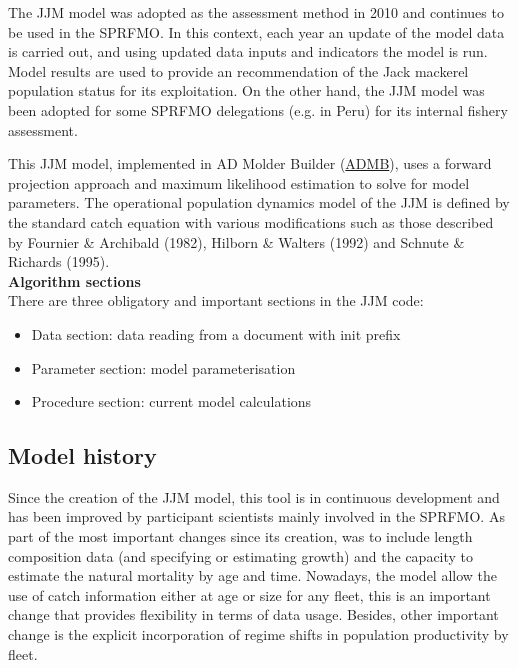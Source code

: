 \documentclass{article}
\begin{document}
The JJM model was adopted as the assessment method in 2010 and continues to be used in the SPRFMO. In this context, each year an update of the model data is carried out, and using updated data inputs and indicators the model is run. Model results are used to provide an recommendation of the Jack mackerel population status for its exploitation. On the other hand, the JJM model was been adopted for some SPRFMO delegations (e.g. in Peru) for its internal fishery assessment.

This JJM model, implemented in AD Molder Builder (\href{https://www.admb-project.org/}{ADMB}), uses a forward projection approach and maximum likelihood estimation to solve for model parameters. The operational population dynamics model of the JJM is defined by the standard catch equation with various modifications such as those described by Fournier \& Archibald (1982), Hilborn \& Walters (1992) and Schnute \& Richards (1995).\\

\textbf{Algorithm sections}\\

There are three obligatory and important sections in the JJM code:

\begin{itemize}
    \item Data section: data reading from a document with init prefix
    \item Parameter section: model parameterisation
    \item Procedure section: current model calculations
\end{itemize}

\subsection{Model history}
Since the creation of the JJM model, this tool is in continuous development and has been improved by participant scientists mainly involved in the SPRFMO. As part of the most important changes since its creation, was to include length composition data (and specifying or estimating growth) and the capacity to estimate the natural mortality by age and time. Nowadays, the model allow the use of catch information either at age or size for any fleet, this is an important change that provides flexibility in terms of data usage. Besides, other important change is the explicit incorporation of regime shifts in population productivity by fleet.
\end{document}
